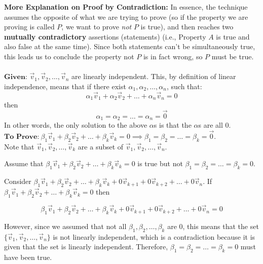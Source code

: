 {    \textbf{More Explanation on Proof by Contradiction:} In essence, the technique assumes the opposite of what we are trying to prove (so if the property we are proving is called $P$, we want to prove \textit{not} $P$ is true), and then reaches two \textbf{mutually contradictory} assertions (statements) (i.e., Property $A$ is true and also false at the same time). Since both statements can't be simultaneously true, this leads us to conclude the property not $P$ is in fact wrong, so $P$ must be true. \\ \\
	$\textbf{Given:}$
	$\vec{v}_1, \vec{v}_2, \ldots, \vec{v}_n$ are linearly independent. This, by definition of linear independence, means that if there exist $\alpha_1, \alpha_2, \ldots, \alpha_n$, such that:
	 $$\alpha_1\vec{v}_1 + \alpha_2\vec{v}_2 + \ldots + \alpha_n\vec{v}_n = 0$$ then  $$\alpha_1=\alpha_2=\ldots=\alpha_n=\vec{0}$$ 
	 In other words, the only solution to the above $\alpha$s is that the $\alpha$s are all $0$.\\
	$\textbf{To Prove:}\ \beta_1\vec{v}_1 + \beta_2\vec{v}_2 + \ldots + \beta_k\vec{v}_k = 0 \implies \beta_1=\beta_2=\ldots=\beta_k=\vec{0}$. \\ Note that $\vec{v}_1, \vec{v}_2, \ldots, \vec{v}_k$ are a subset of $\vec{v}_1, \vec{v}_2, \ldots, \vec{v}_n$.

	Assume that $ \beta_1\vec{v}_1 + \beta_2\vec{v}_2 + \ldots + \beta_k\vec{v}_k = 0 $ is true but not $\beta_1=\beta_2=\ldots=\beta_k=0$. 

	Consider $\beta_1\vec{v}_1 + \beta_2\vec{v}_2 + \ldots + \beta_k\vec{v}_k + 0\vec{v}_{k+1} + 0\vec{v}_{k+2} + \ldots + 0\vec{v}_n$. If $\beta_1\vec{v}_1 + \beta_2\vec{v}_2 + \ldots + \beta_k\vec{v}_k = 0$ then 

	$$\beta_1\vec{v}_1 + \beta_2\vec{v}_2 + \ldots + \beta_k\vec{v}_k + 0\vec{v}_{k+1} + 0\vec{v}_{k+2} + \ldots + 0\vec{v}_n = 0$$ 

	However, since we assumed that not all $\beta_1, \beta_2, \ldots, \beta_k$ are 0, this means that the set $\{\vec{v}_1, \vec{v}_2, \ldots, \vec{v}_n\}$ is not linearly independent, which is a contradiction because it is given that the set is linearly independent. Therefore, $\beta_1=\beta_2=\ldots=\beta_k=0$ must have been true. 
}